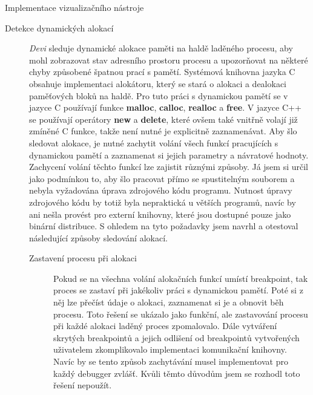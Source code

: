 \documentclass[bc,male,python,dept460]{diploma}						%
\begin{document}
\begin{section}{Implementace vizualizačního nástroje}
\begin{description}
			
			\item[Detekce dynamických alokací]
			\textit{Devi} sleduje dynamické alokace paměti na haldě laděného procesu, aby mohl zobrazovat stav adresního prostoru procesu a upozorňovat na některé
			chyby způsobené špatnou prací s pamětí. Systémová knihovna jazyka C obsahuje implementaci alokátoru, který se stará o alokaci a dealokaci paměťových
			bloků na haldě. Pro tuto práci s dynamickou pamětí se v jazyce C používají funkce \textbf{malloc}, \textbf{calloc}, \textbf{realloc}
			a \textbf{free}. V jazyce C++ se používají operátory \textbf{new} a \textbf{delete}, které ovšem také vnitřně volají již zmíněné C funkce, takže není
			nutné je explicitně zaznamenávat. Aby šlo sledovat alokace, je nutné zachytit volání všech funkcí pracujících s dynamickou pamětí a zaznamenat si
			jejich parametry a návratové hodnoty. Zachycení volání těchto funkcí lze zajistit různými způsoby. Já jsem si určil jako podmínkou to, aby šlo pracovat
			přímo se spustitelným souborem a nebyla vyžadována úprava zdrojového kódu programu.
			Nutnost úpravy zdrojového kódu by totiž byla nepraktická u větších programů, navíc by ani nešla provést pro externí knihovny, které jsou dostupné pouze
			jako binární distribuce.
			S ohledem na tyto požadavky jsem navrhl a otestoval následující způsoby sledování alokací.
			\begin{description}
				\item[Zastavení procesu při alokaci] Pokud se na všechna volání alokačních funkcí umístí breakpoint, tak proces se zastaví při jakékoliv práci s
				dynamickou pamětí. Poté si z něj lze přečíst údaje o alokaci, zaznamenat si je a obnovit běh procesu. Toto řešení se ukázalo jako funkční,
				ale zastavování procesu při každé alokaci laděný proces zpomalovalo. Dále vytváření skrytých breakpointů a jejich odlišení od breakpointů vytvořených
				uživatelem zkomplikovalo implementaci komunikační knihovny. Navíc by se tento způsob zachytávání musel
				implementovat pro každý debugger zvlášť. Kvůli těmto důvodům jsem se rozhodl toto řešení nepoužít.
				

\end{description}
\end{description}
\end{section}
\end{document}
